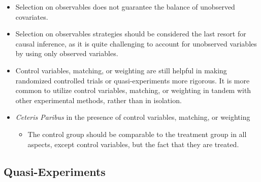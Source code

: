 \documentclass[
]{book}
\providecommand{\tightlist}{%
  \setlength{\itemsep}{0pt}\setlength{\parskip}{0pt}}
\theoremstyle{definition}
\theoremstyle{definition}
\theoremstyle{definition}
\theoremstyle{definition}
\theoremstyle{remark}
\begin{document}
\begin{itemize}
\tightlist
\item
  Selection on observables does not guarantee the balance of unobserved covariates.
\item
  Selection on observables strategies should be considered the last resort for causal inference, as it is quite challenging to account for unobserved variables by using only observed variables.
\item
  Control variables, matching, or weighting are still helpful in making randomized controlled trials or quasi-experiments more rigorous. It is more common to utilize control variables, matching, or weighting in tandem with other experimental methods, rather than in isolation.
\item
  \emph{Ceteris Paribus} in the presence of control variables, matching, or weighting

  \begin{itemize}
  \tightlist
  \item
    The control group should be comparable to the treatment group in all aspects, except control variables, but the fact that they are treated.
  \end{itemize}
\end{itemize}

\hypertarget{quasi-experiments}{%
\subsection{Quasi-Experiments}\label{quasi-experiments}}
\end{document}
